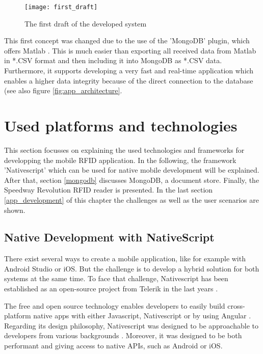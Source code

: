 \begin{figure}
\centering
\texttt{[image: first\_draft]} 
\caption{\label{fig:first_draft}The first draft of the developed system} 
\end{figure}

This first concept was changed due to the use of the 'MongoDB' plugin, which offers Matlab \cite{matlab_mongodb}. This is much easier than exporting all received data from Matlab in *.CSV format and then including it into MongoDB as *.CSV data. Furthermore, it supports developing a very fast and real-time application which enables a higher data integrity because of the direct connection to the database (see also figure \ref{fig:app_architecture}.  

\section{Used platforms and technologies} \label{platforms}

This section focusses on explaining the used technologies and frameworks for developping the mobile RFID application. In the following, the framework 'Nativescript' which can be used for native mobile development will be explained. After that, section \ref{mongodb} discusses MongoDB, a document store. Finally, the Speedway Revolution RFID reader is presented. In the last section \ref{app_development} of this chapter the challenges as well as the user scenarios are shown. 

\subsection{Native Development with NativeScript} 

There exist several ways to create a mobile application, like for example with Android Studio or iOS. But the challenge is to develop a hybrid solution for both systems at the same time.
To face that challenge, Nativescript has been established as an open-source project from Telerik in the last years \cite{nativescript}. 

The free and open source technology enables developers to easily build cross-platform native apps with either Javascript, Nativescript or by using Angular \cite{nativescript}. 
Regarding its design philosophy, Nativescript was designed to be approachable to developers from various backgrounds \cite{nativescript}. Moreover, it was designed to be both performant and giving access to native APIs, such as Android or iOS.

